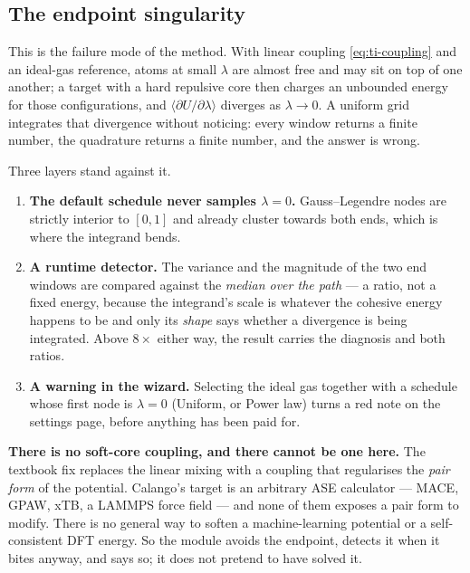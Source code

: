 \subsection{The endpoint singularity}
\label{sec:ti-endpoint}

This is the failure mode of the method. With linear coupling
\eqref{eq:ti-coupling} and an ideal-gas reference, atoms at small $\lambda$ are
almost free and may sit on top of one another; a target with a hard repulsive
core then charges an unbounded energy for those configurations, and
$\langle\partial U/\partial\lambda\rangle$ diverges as $\lambda \to 0$. A
uniform grid integrates that divergence without noticing: every window returns a
finite number, the quadrature returns a finite number, and the answer is wrong.

Three layers stand against it.

\begin{enumerate}
  \item \textbf{The default schedule never samples $\lambda = 0$.}
    Gauss--Legendre nodes are strictly interior to $[0,1]$ and already cluster
    towards both ends, which is where the integrand bends.
  \item \textbf{A runtime detector.} The variance and the magnitude of the two
    end windows are compared against the \emph{median over the path} --- a
    ratio, not a fixed energy, because the integrand's scale is whatever the
    cohesive energy happens to be and only its \emph{shape} says whether a
    divergence is being integrated. Above $8\times$ either way, the result
    carries the diagnosis and both ratios.
  \item \textbf{A warning in the wizard.} Selecting the ideal gas together with
    a schedule whose first node is $\lambda = 0$ (Uniform, or Power law) turns a
    red note on the settings page, before anything has been paid for.
\end{enumerate}

\begin{calnote}
\textbf{There is no soft-core coupling, and there cannot be one here.} The
textbook fix replaces the linear mixing with a coupling that regularises the
\emph{pair form} of the potential. Calango's target is an arbitrary ASE
calculator --- MACE, GPAW, xTB, a LAMMPS force field --- and none of them
exposes a pair form to modify. There is no general way to soften a
machine-learning potential or a self-consistent DFT energy. So the module avoids
the endpoint, detects it when it bites anyway, and says so; it does not pretend
to have solved it.
\end{calnote}

